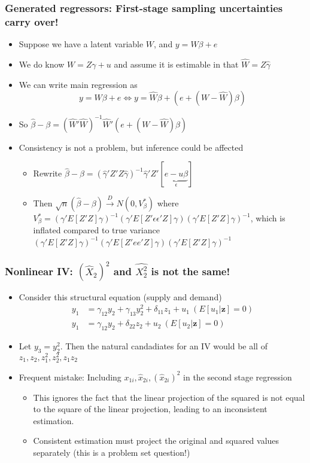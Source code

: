 \documentclass[aspectratio=169]{beamer}
\begin{document}
\begin{frame}
\frametitle{Generated regressors: First-stage sampling uncertainties carry over!}
\begin{itemize}
\item Suppose we have a latent variable $W$, and $y = W\beta+e$
\item  We do know $W= Z\gamma + u$ and assume it is estimable in that $\widehat{W} = Z\hat{\gamma} $
\item We can write main regression as 
\[
y=W\beta+e \iff y=\widehat{W}\beta + (e+(W-\widehat{W})\beta)
\]
\item  So $ \hat{\beta}-\beta =  (\widehat{W}'\widehat{W})^{-1}\widehat{W}'(e+(W-\widehat{W})\beta)$
\item Consistency is not a problem, but inference could be affected
\begin{itemize}
\item Rewrite $\hat{\beta}-\beta=(\hat{\gamma}'Z'Z\hat{\gamma})^{-1}\hat{\gamma}'Z'[\underbrace{e-u\beta}_{\epsilon}]$
\item Then $\sqrt{n}(\hat{\beta}-\beta)\xrightarrow{D}N(0,V_\beta^*)$ where $V_\beta^*=\left(\gamma'E[Z'Z]\gamma\right)^{-1}\left(\gamma'E[Z'\epsilon\epsilon'Z] \gamma\right) \left(\gamma'E[Z'Z]\gamma\right)^{-1}$, which is inflated compared to true variance $\left(\gamma'E[Z'Z]\gamma\right)^{-1}\left(\gamma'E[Z'ee'Z] \gamma\right) \left(\gamma'E[Z'Z]\gamma\right)^{-1}$
\end{itemize}
\end{itemize}
\end{frame}

\begin{frame}
\frametitle{Nonlinear IV: $(\widehat{X}_2)^2$ and $\widehat{X_2^2}$ is not the same!}
\begin{itemize} 
\item Consider this structural equation (supply and demand)
\[
\begin{aligned}
y_{1}&=\gamma_{12}y_{2}+\gamma_{13}y_{2}^2+\delta_{11}z_1+u_1 \ (E[u_1|\mathbf{z}]=0)\\ 
y_{1}&=\gamma_{12}y_{2}+\delta_{22}z_2+u_2 \ (E[u_2|\mathbf{z}]=0)
\end{aligned}
\]
\item Let $y_3 = y_2^2$. Then the natural candadiates for an IV would be all of $z_1,z_2,z_1^2, z_2^2, z_1z_2$
\item Frequent mistake: Including $x_{1i}, \hat{x}_{2i}, (\hat{x}_{2i})^2$ in the second stage regression
\begin{itemize}
\item  This ignores the fact that the linear projection of the squared is not equal to the square of the linear projection, leading to an inconsistent estimation. 
\item Consistent estimation must project the original and squared values separately (this is a problem set question!)
\end{itemize}
\end{itemize}
\end{frame}
\end{document}
